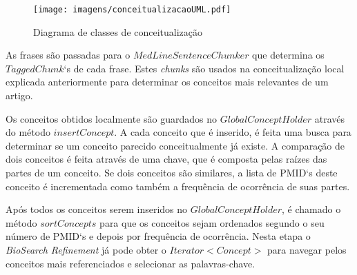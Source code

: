 \begin{figure}[h!]
    \center
    \texttt{[image: imagens/conceitualizacaoUML.pdf]}
    \caption{Diagrama de classes de conceitualização\label{fig:conceitualizacaoUML}}
\end{figure}

As frases são passadas para o $MedLineSentenceChunker$ que determina os $TaggedChunk$`s de cada frase. Estes \emph{chunks} são usados na conceitualização local explicada anteriormente para determinar os conceitos mais relevantes de um artigo.

Os conceitos obtidos localmente são guardados no $GlobalConceptHolder$ através do método $insertConcept$. A cada conceito que é inserido, é feita uma busca para determinar se um conceito parecido conceitualmente já existe. A comparação de dois conceitos é feita através de uma chave, que é composta pelas raízes das partes de um conceito. Se dois conceitos são similares, a lista de PMID`s deste conceito é incrementada como também a frequência de ocorrência de suas partes.

Após todos os conceitos serem inseridos no $GlobalConceptHolder$, é chamado o método $sortConcepts$ para que os conceitos sejam ordenados segundo o seu número de PMID`s e depois por frequência de ocorrência. Nesta etapa o \emph{BioSearch Refinement} já pode obter o $Iterator<Concept>$ para navegar pelos conceitos mais referenciados e selecionar as palavras-chave.
